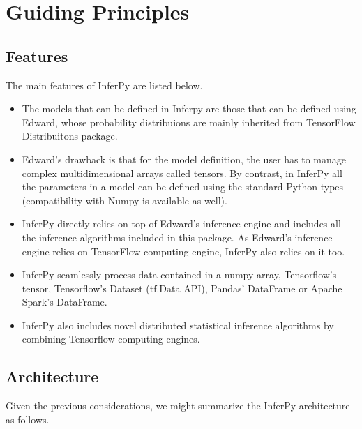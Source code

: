 \documentclass[letterpaper,10pt,english]{sphinxmanual}
\begin{document}
\chapter{Guiding Principles}
\label{\detokenize{notes/gettingGuiding::doc}}\label{\detokenize{notes/gettingGuiding:guiding-principles}}

\section{Features}
\label{\detokenize{notes/gettingGuiding:features}}
The main features of InferPy are listed below.
\begin{itemize}
\item {} 
The models that can be defined in Inferpy are those that can be defined using Edward, whose probability distribuions
are mainly inherited from TensorFlow Distribuitons package.

\item {} 
Edward’s drawback is that for the model definition, the user has to manage complex multidimensional arrays called
tensors. By contrast, in InferPy all the parameters in a model can be defined using the standard Python types
(compatibility with Numpy is available as well).

\item {} 
InferPy directly relies on top of Edward’s inference engine and
includes all the inference algorithms included in this package. As
Edward’s inference engine relies on TensorFlow computing engine,
InferPy also relies on it too.

\item {} 
InferPy seamlessly process data contained in a numpy array, Tensorflow’s
tensor, Tensorflow’s Dataset (tf.Data API), Pandas’ DataFrame or Apache Spark’s
DataFrame.

\item {} 
InferPy also includes novel distributed statistical inference
algorithms by combining Tensorflow computing
engines.

\end{itemize}


\section{Architecture}
\label{\detokenize{notes/gettingGuiding:architecture}}
Given the previous considerations, we might summarize the InferPy architecture as follows.

\begin{figure}[htbp]
\centering

\noindent{}
\end{figure}
\end{document}
